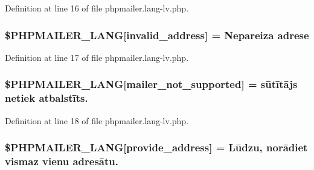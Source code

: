 Definition at line 16 of file phpmailer.\+lang-\/lv.\+php.

\subsubsection[{\texorpdfstring{\$\+P\+H\+P\+M\+A\+I\+L\+E\+R\+\_\+\+L\+A\+NG}{$PHPMAILER_LANG}}]{\setlength{\rightskip}{0pt plus 5cm}\$P\+H\+P\+M\+A\+I\+L\+E\+R\+\_\+\+L\+A\+NG\mbox{[}\textquotesingle{}invalid\+\_\+address\textquotesingle{}\mbox{]} = \textquotesingle{}Nepareiza adrese\textquotesingle{}}\hypertarget{phpmailer_8lang-lv_8php_a42d61bcea4c79599ecb44fd062f54d47}{}\label{phpmailer_8lang-lv_8php_a42d61bcea4c79599ecb44fd062f54d47}


Definition at line 17 of file phpmailer.\+lang-\/lv.\+php.

\subsubsection[{\texorpdfstring{\$\+P\+H\+P\+M\+A\+I\+L\+E\+R\+\_\+\+L\+A\+NG}{$PHPMAILER_LANG}}]{\setlength{\rightskip}{0pt plus 5cm}\$P\+H\+P\+M\+A\+I\+L\+E\+R\+\_\+\+L\+A\+NG\mbox{[}\textquotesingle{}mailer\+\_\+not\+\_\+supported\textquotesingle{}\mbox{]} = \textquotesingle{} sūtītājs netiek atbalstīts.\textquotesingle{}}\hypertarget{phpmailer_8lang-lv_8php_aa2ebcb8833ee83a7ad67401c4bb3a6ad}{}\label{phpmailer_8lang-lv_8php_aa2ebcb8833ee83a7ad67401c4bb3a6ad}


Definition at line 18 of file phpmailer.\+lang-\/lv.\+php.

\subsubsection[{\texorpdfstring{\$\+P\+H\+P\+M\+A\+I\+L\+E\+R\+\_\+\+L\+A\+NG}{$PHPMAILER_LANG}}]{\setlength{\rightskip}{0pt plus 5cm}\$P\+H\+P\+M\+A\+I\+L\+E\+R\+\_\+\+L\+A\+NG\mbox{[}\textquotesingle{}provide\+\_\+address\textquotesingle{}\mbox{]} = \textquotesingle{}Lūdzu, norādiet vismaz vienu adresātu.\textquotesingle{}}\hypertarget{phpmailer_8lang-lv_8php_a8b97897c2406b7392b056f375feeefbb}{}\label{phpmailer_8lang-lv_8php_a8b97897c2406b7392b056f375feeefbb}



